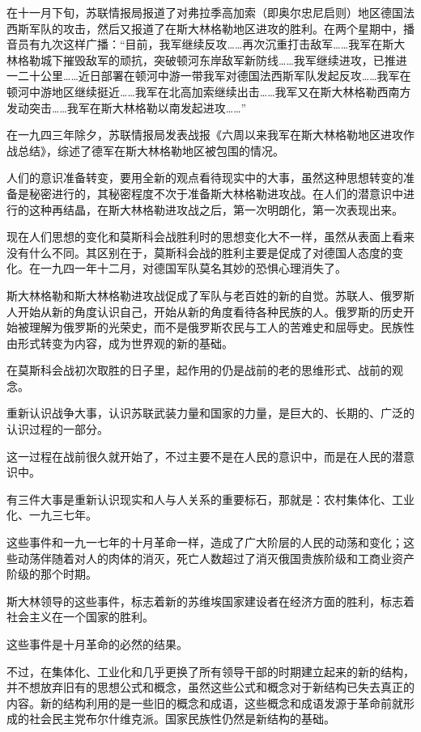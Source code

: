 在十一月下旬，苏联情报局报道了对弗拉季高加索（即奥尔忠尼启则）地区德国法西斯军队的攻击，然后又报道了在斯大林格勒地区进攻的胜利。在两个星期中，播音员有九次这样广播：“目前，我军继续反攻……再次沉重打击敌军……我军在斯大林格勒城下摧毁敌军的顽抗，突破顿河东岸敌军新防线……我军继续进攻，已推进一二十公里……近日部署在顿河中游一带我军对德国法西斯军队发起反攻……我军在顿河中游地区继续挺近……我军在北高加索继续出击……我军又在斯大林格勒西南方发动突击……我军在斯大林格勒以南发起进攻……”

在一九四三年除夕，苏联情报局发表战报《六周以来我军在斯大林格勒地区进攻作战总结》，综述了德军在斯大林格勒地区被包围的情况。

人们的意识准备转变，要用全新的观点看待现实中的大事，虽然这种思想转变的准备是秘密进行的，其秘密程度不次于准备斯大林格勒进攻战。在人们的潜意识中进行的这种再结晶，在斯大林格勒进攻战之后，第一次明朗化，第一次表现出来。

现在人们思想的变化和莫斯科会战胜利时的思想变化大不一样，虽然从表面上看来没有什么不同。其区别在于，莫斯科会战的胜利主要是促成了对德国人态度的变化。在一九四一年十二月，对德国军队莫名其妙的恐惧心理消失了。

斯大林格勒和斯大林格勒进攻战促成了军队与老百姓的新的自觉。苏联人、俄罗斯人开始从新的角度认识自己，开始从新的角度看待各种民族的人。俄罗斯的历史开始被理解为俄罗斯的光荣史，而不是俄罗斯农民与工人的苦难史和屈辱史。民族性由形式转变为内容，成为世界观的新的基础。

在莫斯科会战初次取胜的日子里，起作用的仍是战前的老的思维形式、战前的观念。

重新认识战争大事，认识苏联武装力量和国家的力量，是巨大的、长期的、广泛的认识过程的一部分。

这一过程在战前很久就开始了，不过主要不是在人民的意识中，而是在人民的潜意识中。

有三件大事是重新认识现实和人与人关系的重要标石，那就是：农村集体化、工业化、一九三七年。

这些事件和一九一七年的十月革命一样，造成了广大阶层的人民的动荡和变化；这些动荡伴随着对人的肉体的消灭，死亡人数超过了消灭俄国贵族阶级和工商业资产阶级的那个时期。

斯大林领导的这些事件，标志着新的苏维埃国家建设者在经济方面的胜利，标志着社会主义在一个国家的胜利。

这些事件是十月革命的必然的结果。

不过，在集体化、工业化和几乎更换了所有领导干部的时期建立起来的新的结构，并不想放弃旧有的思想公式和概念，虽然这些公式和概念对于新结构已失去真正的内容。新的结构利用的是一些旧的概念和成语，这些概念和成语发源于革命前就形成的社会民主党布尔什维克派。国家民族性仍然是新结构的基础。

